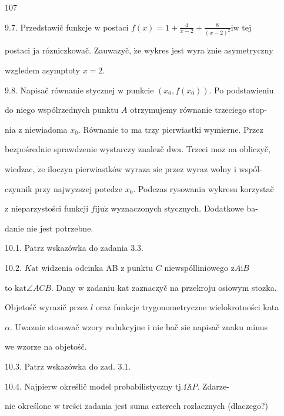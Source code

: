 \documentclass[a4paper,12pt]{article}
\begin{document}
107

9.7. Przedstawič funkcje $\mathrm{w}$ postaci $f(x)=1+\displaystyle \frac{4}{x-2}+\frac{8}{(x-2)^{2}}\mathrm{i}\mathrm{w}$ tej

postaci $\mathrm{j}\mathrm{a}$ rózniczkowač. Zauwazyč, $\dot{\mathrm{z}}\mathrm{e}$ wykres jest wyra $\acute{\mathrm{z}}\mathrm{n}\mathrm{i}\mathrm{e}$ asymetryczny

wzgledem asymptoty $x=2.$

9.8. Napisač równanie stycznej $\mathrm{w}$ punkcie $(x_{0},f(x_{0}))$. Po podstawieniu

do niego wspólrzednych punktu $A$ otrzymujemy równanie trzeciego stop-

nia $\mathrm{z}$ niewiadoma $x_{0}$. Równanie to ma trzy pierwiastki wymierne. Przez

bezpośrednie sprawdzenie wystarczy znalez$\acute{}$č $\mathrm{d}\mathrm{w}\mathrm{a}$. Trzeci $\mathrm{m}\mathrm{o}\dot{\mathrm{z}}$ na obliczyč,

wiedzac, $\dot{\mathrm{z}}\mathrm{e}$ iloczyn pierwiastków wyraza $\mathrm{s}\mathrm{i}\mathrm{e}$ przez wyraz wolny $\mathrm{i}$ wspól-

czynnik przy najwyzszej potedze $x_{0}$. Podczas rysowania wykresu korzystač

$\mathrm{z}$ nieparzystości funkcji $f \mathrm{i}\mathrm{j}\mathrm{u}\dot{\mathrm{z}}$ wyznaczonych stycznych. Dodatkowe ba-

danie nie jest potrzebne.

10.1. Patrz wskazówka do zadania 3.3.

10.2. $K\mathrm{a}\mathrm{t}$ widzenia odcinka AB $\mathrm{z}$ punktu $C$ niewspólliniowego $\mathrm{z}A\mathrm{i}B$

to $\mathrm{k}\mathrm{a}\mathrm{t}\angle ACB$. Dany $\mathrm{w}$ zadaniu $\mathrm{k}\mathrm{a}\mathrm{t}$ zaznaczyč na przekroju osiowym stozka.

Objetośč wyrazič przez $l$ oraz funkcje trygonometryczne wielokrotności kata

$\alpha$. Uwaznie stosowač wzory redukcyjne $\mathrm{i}$ nie bač $\mathrm{s}\mathrm{i}\mathrm{e}$ napisač znaku minus

we wzorze na objetośč.

10.3. Patrz wskazówka do $\mathrm{z}\mathrm{a}\mathrm{d}$. 3.1.

10.4. Najpierw określič model probabilistyczny $\mathrm{t}\mathrm{j}. \Omega \mathrm{i} P$. Zdarze-

nie określone $\mathrm{w}$ treści zadania jest suma czterech rozlacznych (dlaczego?)
\end{document}
